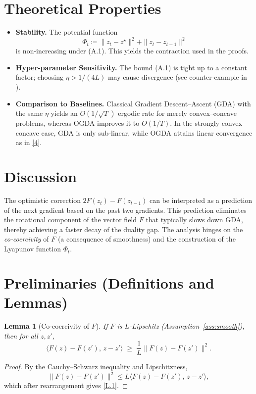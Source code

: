 \documentclass[11pt]{article}
\newtheorem{lemma}{Lemma}[section]
\begin{document}
\section*{Theoretical Properties}
\begin{itemize}[leftmargin=*]
\item \textbf{Stability.} The potential function 
\[
\Phi_t\coloneqq\|z_t-z^{\star}\|^2+\|z_t-z_{t-1}\|^2
\]
is non‑increasing under (A.1). This yields the contraction used in the proofs.
\item \textbf{Hyper‑parameter Sensitivity.} The bound (A.1) is tight up to a constant factor; choosing $\eta>1/(4L)$ may cause divergence (see counter‑example in \cite{daskalakis2018training}).
\item \textbf{Comparison to Baselines.} Classical Gradient Descent–Ascent (GDA) with the same $\eta$ yields an $O(1/\sqrt{T})$ ergodic rate for merely convex–concave problems, whereas OGDA improves it to $O(1/T)$. In the strongly convex–concave case, GDA is only sub‑linear, while OGDA attains linear convergence as in \eqref{4}.
\end{itemize}

\section*{Discussion}
The optimistic correction $2F(z_t)-F(z_{t-1})$ can be interpreted as a prediction of the next gradient based on the past two gradients. This prediction eliminates the rotational component of the vector field $F$ that typically slows down GDA, thereby achieving a faster decay of the duality gap. The analysis hinges on the \emph{co‑coercivity} of $F$ (a consequence of smoothness) and the construction of the Lyapunov function $\Phi_t$.

\section*{Preliminaries (Definitions and Lemmas)}
\begin{lemma}[Co‑coercivity of $F$]\label{lem:coco}
If $F$ is $L$‑Lipschitz (Assumption~\ref{ass:smooth}), then for all $z,z'$,
\[
\langle F(z)-F(z'),\,z-z'\rangle\;\ge\;\frac{1}{L}\|F(z)-F(z')\|^2.
\tag{L.1}
\]
\end{lemma}
\begin{proof}
By the Cauchy–Schwarz inequality and Lipschitzness,
\[
\|F(z)-F(z')\|^2\le L\langle F(z)-F(z'),\,z-z'\rangle,
\]
which after rearrangement gives \eqref{L.1}. \hfill\qedsymbol
\end{proof}
\end{document}
